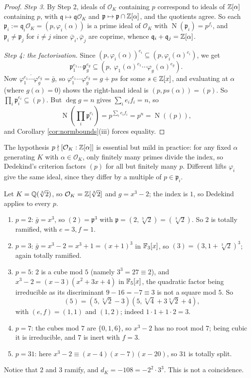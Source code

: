 \documentclass[a4paper]{scrartcl}
\renewcommand{\OO}{\mathcal{O}}
\newcommand{\Nm}{\operatorname{N}}
\newcommand{\fp}{\mathfrak{p}}
\newcommand{\fq}{\mathfrak{q}}
\begin{document}
\begin{proof}
	\emph{Step 3.} By Step 2, ideals of $\OO_K$ containing $p$ correspond to ideals of $\mathbb{Z}[\alpha]$ containing $p$, with $\fq \mapsto \fq\OO_K$ and $\fp \mapsto \fp\cap\Z[\alpha]$, and the quotients agree. So each $\fp_i := \fq_i\OO_K = (p, \varphi_i(\alpha))$ is a prime ideal of $\OO_K$ with $\Nm(\fp_i) = p^{f_i}$, and $\fp_i \neq \fp_j$ for $i \neq j$ since $\bar\varphi_i, \bar\varphi_j$ are coprime, whence $\fq_i + \fq_j = \Z[\alpha]$.

	\emph{Step 4: the factorisation.} Since $(p,\varphi_i(\alpha))^{e_i} \subseteq (p, \varphi_i(\alpha)^{e_i})$, we get
	$$\fp_1^{e_1}\cdots\fp_g^{e_g} \subseteq \left(p,\ \varphi_1(\alpha)^{e_1}\cdots\varphi_g(\alpha)^{e_g}\right).$$
	Now $\overline{\varphi_1^{e_1}\cdots\varphi_g^{e_g}} = \bar g$, so $\varphi_1^{e_1}\cdots\varphi_g^{e_g} = g + ps$ for some $s \in \mathbb{Z}[x]$, and evaluating at $\alpha$ (where $g(\alpha) = 0$) shows the right-hand ideal is $(p, ps(\alpha)) = (p)$. So $\prod_i\fp_i^{e_i} \subseteq (p)$. But $\deg g = n$ gives $\sum_i e_if_i = n$, so
	$$\Nm\left(\prod_i\fp_i^{e_i}\right) = p^{\sum_ie_if_i} = p^n = \Nm((p)),$$
	and Corollary \ref{cor:normbounds}(iii) forces equality.
\end{proof}

\begin{remark}
	The hypothesis $p \nmid [\OO_K:\Z[\alpha]]$ is essential but mild in practice: for any fixed $\alpha$ generating $K$ with $\alpha\in\OO_K$, only finitely many primes divide the index, so Dedekind's criterion factors $(p)$ for all but finitely many $p$. Different lifts $\varphi_i$ give the same ideal, since they differ by a multiple of $p \in \fp_i$.
\end{remark}

\begin{example}\label{ex:cbrt2}
	Let $K = \mathbb{Q}(\sqrt[3]2)$, so $\OO_K = \Z[\sqrt[3]2]$ and $g = x^3-2$; the index is $1$, so Dedekind applies to every $p$.
	\begin{enumerate}[label=(\roman*)]
		\item $p = 2$: $\bar g = x^3$, so $(2) = \fp^3$ with $\fp = (2, \sqrt[3]2) = (\sqrt[3]2)$. So $2$ is totally ramified, with $e = 3, f = 1$.
		\item $p = 3$: $\bar g = x^3 - 2 = x^3+1 = (x+1)^3$ in $\mathbb{F}_3[x]$, so $(3) = (3, 1+\sqrt[3]2)^3$; again totally ramified.
		\item $p = 5$: $2$ is a cube mod $5$ (namely $3^3 = 27 \equiv 2$), and $x^3-2 = (x-3)(x^2+3x+4)$ in $\mathbb{F}_5[x]$, the quadratic factor being irreducible as its discriminant $9-16 = -7 \equiv 3$ is not a square mod $5$. So
		$$(5) = \left(5, \sqrt[3]2 - 3\right)\left(5, \sqrt[3]4 + 3\sqrt[3]2+4\right),$$
		with $(e,f) = (1,1)$ and $(1,2)$; indeed $1\cdot1 + 1\cdot 2 = 3$.
		\item $p = 7$: the cubes mod $7$ are $\{0,1,6\}$, so $x^3-2$ has no root mod $7$; being cubic it is irreducible, and $7$ is inert with $f = 3$.
		\item $p = 31$: here $x^3 - 2 \equiv (x-4)(x-7)(x-20)$, so $31$ is totally split.
	\end{enumerate}
	Notice that $2$ and $3$ ramify, and $d_K = -108 = -2^2\cdot 3^3$. This is not a coincidence.
\end{example}
\end{document}
